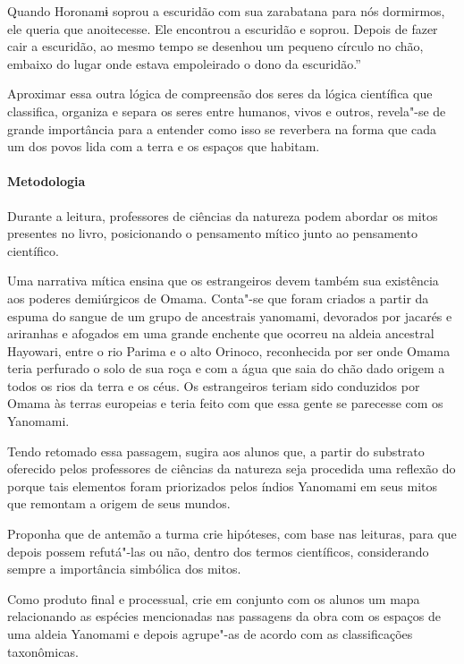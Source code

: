 \documentclass[12pt]{extarticle}
\begin{document}
{Quando Horonamɨ soprou a escuridão com sua zarabatana para nós dormirmos, ele queria que 
anoitecesse. Ele encontrou a escuridão e soprou. Depois de fazer cair a escuridão, ao mesmo 
tempo se desenhou um pequeno círculo no chão, embaixo do lugar onde estava empoleirado o 
dono da escuridão.''

Aproximar essa outra lógica de compreensão dos seres da lógica científica que classifica,
organiza e separa os seres entre humanos, vivos e outros, revela"-se de grande importância
para a entender como isso se reverbera na forma que cada um dos povos lida com a terra e os 
espaços que habitam. 

\paragraph{Metodologia}

Durante a leitura, professores de ciências da natureza podem abordar os mitos 
presentes no livro, posicionando o pensamento mítico junto ao pensamento científico.

Uma narrativa mítica ensina que os estrangeiros devem também sua
existência aos poderes demiúrgicos de Omama. Conta"-se que foram criados
a partir da espuma do sangue de um grupo de ancestrais yanomami, devorados por jacarés 
e ariranhas e afogados em uma grande enchente que ocorreu na aldeia ancestral Hayowari, entre 
o rio Parima e o alto Orinoco, reconhecida por ser onde Omama teria perfurado o solo de sua 
roça e com a água que saia do chão dado origem a todos os rios da terra e os céus. Os estrangeiros 
teriam sido conduzidos por Omama às terras europeias e teria feito com que essa gente se parecesse
com os Yanomami.

Tendo retomado essa passagem, sugira aos alunos que, a partir do
substrato oferecido pelos professores de ciências da natureza seja
procedida uma reflexão do porque tais elementos foram priorizados pelos
índios Yanomami em seus mitos que remontam a origem de seus mundos.

Proponha que de antemão a turma crie hipóteses, com base nas leituras, para que 
depois possem refutá"-las ou não, dentro dos termos científicos, considerando
sempre a importância simbólica dos mitos. 

Como produto final e processual, crie em conjunto com os alunos um mapa relacionando as 
espécies mencionadas nas passagens da obra com os espaços de uma aldeia Yanomami e depois agrupe"-as 
de acordo com as classificações taxonômicas.

}
\end{document}
